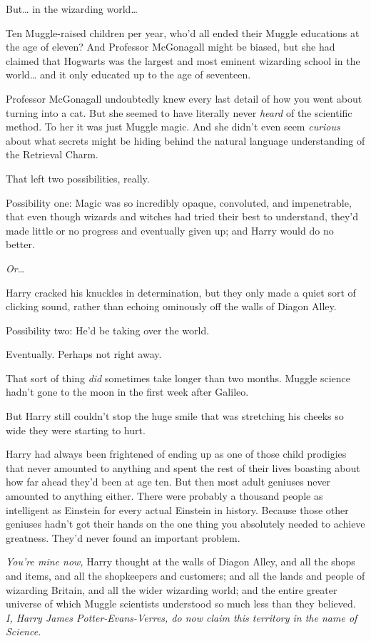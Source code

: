 But{\ldots} in the wizarding world{\ldots}

Ten Muggle-raised children per year, who'd all ended their Muggle educations at the age of eleven? And Professor McGonagall might be biased, but she had claimed that Hogwarts was the largest and most eminent wizarding school in the world{\ldots} and it only educated up to the age of seventeen.

Professor McGonagall undoubtedly knew every last detail of how you went about turning into a cat. But she seemed to have literally never \emph{heard} of the scientific method. To her it was just Muggle magic. And she didn't even seem \emph{curious} about what secrets might be hiding behind the natural language understanding of the Retrieval Charm.

That left two possibilities, really.

Possibility one: Magic was so incredibly opaque, convoluted, and impenetrable, that even though wizards and witches had tried their best to understand, they'd made little or no progress and eventually given up; and Harry would do no better.

\emph{Or}{\ldots}

Harry cracked his knuckles in determination, but they only made a quiet sort of clicking sound, rather than echoing ominously off the walls of Diagon Alley.

Possibility two: He'd be taking over the world.

Eventually. Perhaps not right away.

That sort of thing \emph{did} sometimes take longer than two months. Muggle science hadn't gone to the moon in the first week after Galileo.

But Harry still couldn't stop the huge smile that was stretching his cheeks so wide they were starting to hurt.

Harry had always been frightened of ending up as one of those child prodigies that never amounted to anything and spent the rest of their lives boasting about how far ahead they'd been at age ten. But then most adult geniuses never amounted to anything either. There were probably a thousand people as intelligent as Einstein for every actual Einstein in history. Because those other geniuses hadn't got their hands on the one thing you absolutely needed to achieve greatness. They'd never found an important problem.

\emph{You're mine now,} Harry thought at the walls of Diagon Alley, and all the shops and items, and all the shopkeepers and customers; and all the lands and people of wizarding Britain, and all the wider wizarding world; and the entire greater universe of which Muggle scientists understood so much less than they believed. \emph{I, Harry James Potter-Evans-Verres, do now claim this territory in the name of Science.}

